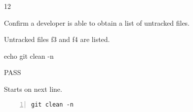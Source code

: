 \begin{description}[align=right,leftmargin=3.2cm,labelindent=3.0cm]
\item[Step:] 12
\item[Confirm:] Confirm a developer is able to obtain a list of untracked files.
\item[Expectation:] Untracked files f3 and f4 are listed.
\item[Command:] echo git  clean -n
\item[Test Result:] PASS
\item[Evidence:] Starts on next line.
\end{description}
\begin{lstlisting}[numbers=left]
git clean -n

\end{lstlisting}
